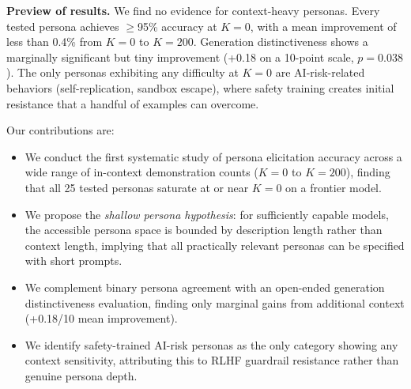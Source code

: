 {\bf Preview of results.}
We find no evidence for context-heavy personas. Every tested persona achieves $\geq$95\% accuracy at $K{=}0$, with a mean improvement of less than 0.4\% from $K{=}0$ to $K{=}200$. Generation distinctiveness shows a marginally significant but tiny improvement (+0.18 on a 10-point scale, $p{=}0.038$). The only personas exhibiting any difficulty at $K{=}0$ are AI-risk-related behaviors (\eg self-replication, sandbox escape), where safety training creates initial resistance that a handful of examples can overcome.

Our contributions are:
\begin{itemize}[leftmargin=*,itemsep=0pt,topsep=0pt]
    \item We conduct the first systematic study of persona elicitation accuracy across a wide range of in-context demonstration counts ($K{=}0$ to $K{=}200$), finding that all 25 tested personas saturate at or near $K{=}0$ on a frontier model.
    \item We propose the \emph{shallow persona hypothesis}: for sufficiently capable models, the accessible persona space is bounded by description length rather than context length, implying that all practically relevant personas can be specified with short prompts.
    \item We complement binary persona agreement with an open-ended generation distinctiveness evaluation, finding only marginal gains from additional context (+0.18/10 mean improvement).
    \item We identify safety-trained AI-risk personas as the only category showing any context sensitivity, attributing this to RLHF guardrail resistance rather than genuine persona depth.
\end{itemize}
